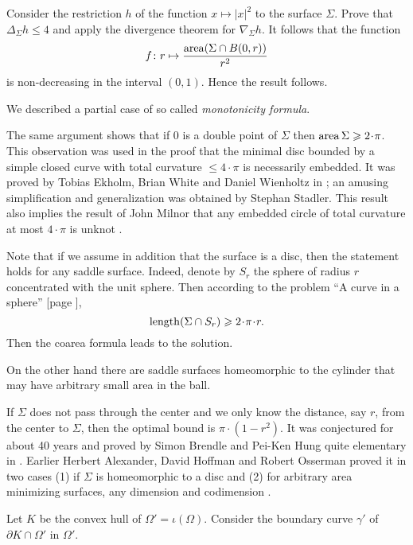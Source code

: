 Consider the restriction $h$ of the function $x\mapsto |x|^2$ to the surface $\Sigma$.
Prove that $\Delta_\Sigma h\le 4$ and apply the divergence theorem for $\nabla_\Sigma h$.
It follows that the function
\[f\colon r\mapsto \frac{\operatorname{\rm area}(\Sigma\cap B(0,r))}{r^2}
\]
is non-decreasing in the interval $(0,1)$.
Hence the result follows.\qeds

We described a partial case of so called \emph{monotonicity formula}.

The same argument shows that if $0$ is a double point
of $\Sigma$ then $\area\Sigma\ge 2\cdot \pi$.
This observation was used in the proof 
that the minimal disc bounded by a simple closed curve with total curvature $\le 4\cdot\pi$ 
is necessarily embedded.
It was proved by 
Tobias Ekholm, 
Brian White
and Daniel Wienholtz
in \cite{EWW};
an amusing simplification and generalization
was obtained by 
Stephan Stadler. %
This result also implies the result of John Milnor that any embedded circle of total curvature at most $4\cdot\pi$ is unknot \cite[see][]{milnor}.

Note that if we assume in addition that the surface is a disc,
then the statement holds for any saddle surface. 
Indeed, denote by $S_r$ the sphere of radius $r$ concentrated with the unit sphere. 
Then according to the problem ``A curve in a sphere'' [page \pageref{A curve in a sphere}], 
\[\length(\Sigma\cap S_r)\ge 2\cdot\pi\cdot r.\]
Then the coarea formula leads to the solution.

On the other hand there are saddle surfaces homeomorphic to the cylinder
that may have arbitrary small area in the ball. 

If $\Sigma$ does not pass through the center 
and we only know the distance, say $r$, 
from the center to $\Sigma$,
then the optimal bound is $\pi\cdot(1-r^2)$.
It was conjectured for about 40 years and proved by Simon Brendle and Pei-Ken Hung quite elementary in \cite{brende-hung}.
Earlier Herbert Alexander, 
David Hoffman
and Robert Osserman 
proved it in two cases (1) if $\Sigma$ is homeomorphic to a disc and (2) for arbitrary area minimizing surfaces, any dimension and codimension
 \cite[see][]{alexander-osserman,alexander-hoffman-osserman}.






Let $K$ be the convex hull of $\Omega'=\iota(\Omega)$.
Consider the boundary curve $\gamma'$ of $\partial K\cap \Omega'$ in $\Omega'$.

